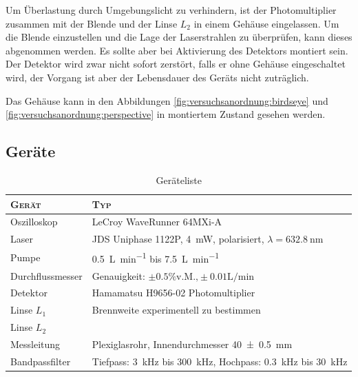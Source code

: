 Um \"Uberlastung  durch Umgebungslicht zu verhindern,  ist der Photomultiplier
zusammen mit der Blende und der Linse $L_2$ in einem Geh\"ause eingelassen. Um
die Blende einzustellen und die Lage der Laserstrahlen zu \"uberpr\"ufen, kann
dieses  abgenommen  werden.  Es  sollte aber  bei  Aktivierung  des  Detektors
montiert sein. Der Detektor  wird zwar nicht sofort zerst\"ort,  falls er ohne
Geh\"ause  eingeschaltet  wird,  der  Vorgang ist  aber  der  Lebensdauer  des
Ger\"ats nicht zutr\"aglich.

Das Geh\"ause kann in den Abbildungen \ref{fig:versuchsanordnung:birdseye} und
\ref{fig:versuchsanordnung:perspective} in montiertem Zustand gesehen werden.


\clearpage
\subsection{Ger\"ate}
\label{subsec:messgerate}

\begin{table}[h!t]
    \centering
    \caption{Ger\"ateliste}
    \begin{tabular}{ll}
        \toprule
        \textsc{Ger\"at}
        & \textsc{Typ}
        \\

        \midrule

        Oszilloskop
        & LeCroy WaveRunner 64MXi-A
        \\

        Laser
        & JDS Uniphase 1122P, \SI{4}{\milli\watt}, polarisiert, $\lambda = \SI{632,8}{\nano\meter}$
        \\

        Pumpe
        & \SI{0.5}{\liter\per\minute} bis \SI{7.5}{\liter\per\minute}
        \\

        Durchflussmesser
        & Genauigkeit: $\pm 0.5\% \text{v.M.,} \pm 0.01 \si{\liter\per\minute}$
        \\

        Detektor
        & Hamamatsu H9656-02 Photomultiplier
        \\

        Linse $L_1$
        & Brennweite experimentell zu bestimmen
        \\

        Linse $L_2$
        & \\

        Messleitung
        & Plexiglasrohr, Innendurchmesser \SI{40 \pm 0.5}{\milli\meter}
        \\

        Bandpassfilter
        & Tiefpass: \SI{3}{\kilo\hertz} bis \SI{300}{\kilo\hertz}, Hochpass: \SI{0.3}{\kilo\hertz} bis \SI{30}{\kilo\hertz}
        \\

        \bottomrule
    \end{tabular}
\end{table}

